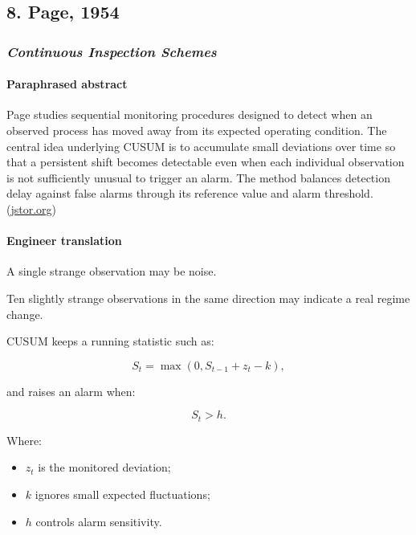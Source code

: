 \subsection{8. Page, 1954}\label{page-1954}

\subsubsection{\texorpdfstring{\emph{Continuous Inspection Schemes}}{Continuous Inspection Schemes}}\label{continuous-inspection-schemes}

\paragraph{Paraphrased abstract}\label{paraphrased-abstract-7}

Page studies sequential monitoring procedures designed to detect when an observed process has moved away from its expected operating condition. The central idea underlying CUSUM is to accumulate small deviations over time so that a persistent shift becomes detectable even when each individual observation is not sufficiently unusual to trigger an alarm. The method balances detection delay against false alarms through its reference value and alarm threshold. (\href{https://www.jstor.org/stable/2333009?utm_source=chatgpt.com}{jstor.org})

\paragraph{Engineer translation}\label{engineer-translation-7}

A single strange observation may be noise.

Ten slightly strange observations in the same direction may indicate a real regime change.

CUSUM keeps a running statistic such as:

\[
S_t=\max(0,S_{t-1}+z_t-k),
\]

and raises an alarm when:

\[
S_t>h.
\]

Where:

\begin{itemize}
\tightlist
\item
  \(z_t\) is the monitored deviation;
\item
  \(k\) ignores small expected fluctuations;
\item
  \(h\) controls alarm sensitivity.
\end{itemize}

